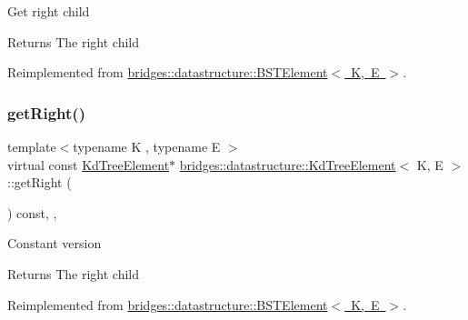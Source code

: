 Get right child \begin{DoxyReturn}{Returns}
The right child 
\end{DoxyReturn}


Reimplemented from \mbox{\hyperlink{classbridges_1_1datastructure_1_1_b_s_t_element_a80f5085d6d03805dd3091b7693d8e235}{bridges\+::datastructure\+::\+B\+S\+T\+Element$<$ K, E $>$}}.

\mbox{\label{classbridges_1_1datastructure_1_1_kd_tree_element_ae8d6007d3848b72cbfc11d2e29120781}} 
\subsubsection{\texorpdfstring{get\+Right()}{getRight()}\hspace{0.1cm}{\footnotesize\ttfamily [2/2]}}
{\footnotesize\ttfamily template$<$typename K , typename E $>$ \\
virtual const \mbox{\hyperlink{classbridges_1_1datastructure_1_1_kd_tree_element}{Kd\+Tree\+Element}}$\ast$ \mbox{\hyperlink{classbridges_1_1datastructure_1_1_kd_tree_element}{bridges\+::datastructure\+::\+Kd\+Tree\+Element}}$<$ K, E $>$\+::get\+Right (\begin{DoxyParamCaption}{ }\end{DoxyParamCaption}) const\hspace{0.3cm}{\ttfamily [inline]}, {\ttfamily [override]}, {\ttfamily [virtual]}}

Constant version

\begin{DoxyReturn}{Returns}
The right child 
\end{DoxyReturn}


Reimplemented from \mbox{\hyperlink{classbridges_1_1datastructure_1_1_b_s_t_element_a012f0eb09c3d62b14c73109e6ded0879}{bridges\+::datastructure\+::\+B\+S\+T\+Element$<$ K, E $>$}}.

\mbox{\label{classbridges_1_1datastructure_1_1_kd_tree_element_a9862bde7b85254224963e23dd9bcee29}} 
